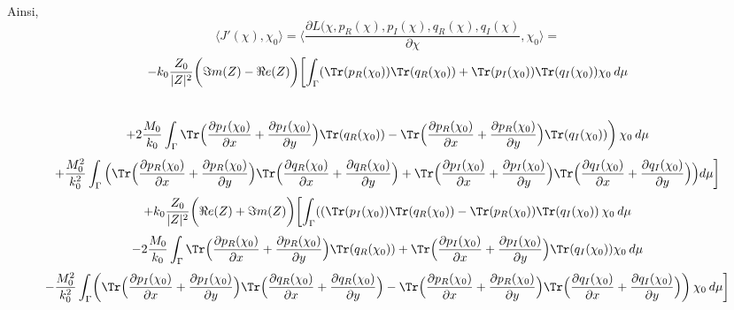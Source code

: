 Ainsi, 
\[ 
\langle J'(\chi), \chi_0\rangle = 
\langle \frac{\partial L(\chi, p_R(\chi), p_I(\chi), q_R(\chi), q_I(\chi)}{\partial \chi}, \chi_0\rangle = \]
\[
 -k_0\frac{Z_0}{|Z|^2} \biggl( \Im m(Z) - \Re e(Z) \biggl) \biggl[ \int_{\Gamma} ( \Tr(p_R(\chi_0)) \Tr(q_R(\chi_0)) + \Tr(p_I(\chi_0)) \Tr(q_I(\chi_0))\chi_0 \hspace{2pt} d\mu  \]\
\[
+ 2 \frac{M_0}{k_0} \int_{\Gamma}   \Tr \Bigl( \frac{\partial p_I(\chi_0)}{\partial x}+\frac{\partial p_I(\chi_0)}{\partial y} \Bigr) \Tr(q_R(\chi_0)) - \Tr \Bigl( \frac{\partial p_R(\chi_0)}{\partial x}+\frac{\partial p_R(\chi_0)}{\partial y} \Bigr) \Tr(q_I(\chi_0)) \biggl)\hspace{2pt} \chi_0 \hspace{2pt} d\mu 
\]
\[
+ \frac{M_0^2}{k_0^2}\int_{\Gamma}\Big( \Tr \Bigl( \frac{\partial p_R(\chi_0)}{\partial x}+\frac{\partial p_R(\chi_0)}{\partial y}\Bigr)\Tr\Bigl( \frac{\partial q_R(\chi_0)}{\partial x}+\frac{\partial q_R(\chi_0)}{\partial y}\Bigr) + \Tr \Bigl( \frac{\partial p_I(\chi_0)}{\partial x}+\frac{\partial p_I(\chi_0)}{\partial y}\Bigr)\Tr\Bigl( \frac{\partial q_I(\chi_0)}{\partial x}+\frac{\partial q_I(\chi_0)}{\partial y}\Bigr)\Big) d\mu \biggl]  \]
\[
+ k_0\frac{Z_0}{|Z|^2}\biggl(\Re e(Z)+\Im m(Z)\biggl)\biggl[ \int_{\Gamma} ( ( \Tr(p_I(\chi_0)) \Tr(q_R(\chi_0)) - \Tr(p_R(\chi_0)) \Tr(q_I(\chi_0)) \hspace{2pt} \chi_0 \hspace{2pt} d\mu \]
\[
- 2\frac{M_0}{k_0} \int_{\Gamma} \Tr \Bigl( \frac{\partial p_R(\chi_0)}{\partial x}+\frac{\partial p_R(\chi_0)}{\partial y} \Bigr) \Tr(q_R(\chi_0)) + \Tr \Bigl( \frac{\partial p_I(\chi_0)}{\partial x}+\frac{\partial p_I(\chi_0)}{\partial y} \Bigr) \Tr(q_I(\chi_0)) \chi_0 \hspace{2pt} d\mu 
\]
\[
- \frac{M_0^2}{k_0^2}\int_{\Gamma}
\biggl(\Tr \Bigl( \frac{\partial p_I(\chi_0)}{\partial x}+\frac{\partial p_I(\chi_0)}{\partial y}\Bigr)\Tr\Bigl( \frac{\partial q_R(\chi_0)}{\partial x}+\frac{\partial q_R(\chi_0)}{\partial y}\Bigr) - \Tr \Bigl( \frac{\partial p_R(\chi_0)}{\partial x}+\frac{\partial p_R(\chi_0)}{\partial y}\Bigr)\Tr\Bigl( \frac{\partial q_I(\chi_0)}{\partial x}+\frac{\partial q_I(\chi_0)}{\partial y}\Bigr) \biggl) \hspace{2pt} \chi_0  \hspace{2pt} d\mu \biggl]\]

